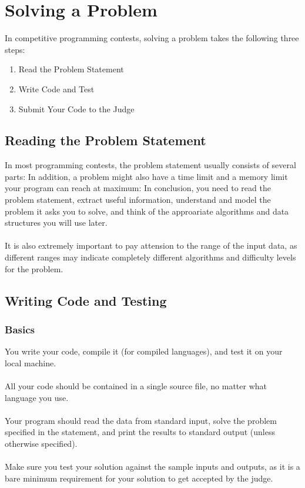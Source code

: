 \documentclass {article}
\begin{document}
\newpage
\section{Solving a Problem}
In competitive programming contests, solving a problem takes
the following three steps:
\begin{enumerate}
    \item Read the Problem Statement
    \item Write Code and Test
    \item Submit Your Code to the Judge
\end{enumerate}

\subsection{Reading the Problem Statement}
In most programming contests, the problem statement usually
consists of several parts:
\noindent In addition, a problem might also have a time limit and a memory limit
your program can reach at maximum:
\noindent In conclusion, you need to read the problem statement, 
extract useful information,
understand and model the problem it asks you to solve,
and think of the approariate algorithms and data structures 
you will use later.\\\\
It is also extremely important to pay attension to the range of the input
data, as different ranges may indicate completely different algorithms
and difficulty levels for the problem.

\newpage
\subsection{Writing Code and Testing}
\subsubsection{Basics}
You write your code, compile it (for compiled languages), and test it on your
local machine.\\\\
All your code should be contained in a single source file, no matter what
language you use.\\\\
Your program should read the data from standard input, solve the problem
specified in the statement, and print the results to standard output (unless
otherwise specified).\\\\
Make sure you test your solution against the sample inputs and outputs, as it is
a bare minimum requirement for your solution to get accepted by the judge.
\end{document}
